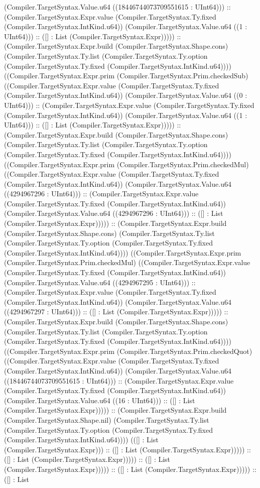 \documentclass[11pt]{article}
\begin{document}
(Compiler.TargetSyntax.Value.u64 ((18446744073709551615 : UInt64))) :: (Compiler.TargetSyntax.Expr.value (Compiler.TargetSyntax.Ty.fixed (Compiler.TargetSyntax.IntKind.u64)) (Compiler.TargetSyntax.Value.u64 ((1 : UInt64))) :: ([] : List (Compiler.TargetSyntax.Expr))))) :: (Compiler.TargetSyntax.Expr.build (Compiler.TargetSyntax.Shape.cons) (Compiler.TargetSyntax.Ty.list (Compiler.TargetSyntax.Ty.option (Compiler.TargetSyntax.Ty.fixed (Compiler.TargetSyntax.IntKind.u64)))) ((Compiler.TargetSyntax.Expr.prim (Compiler.TargetSyntax.Prim.checkedSub) ((Compiler.TargetSyntax.Expr.value (Compiler.TargetSyntax.Ty.fixed (Compiler.TargetSyntax.IntKind.u64)) (Compiler.TargetSyntax.Value.u64 ((0 : UInt64))) :: (Compiler.TargetSyntax.Expr.value (Compiler.TargetSyntax.Ty.fixed (Compiler.TargetSyntax.IntKind.u64)) (Compiler.TargetSyntax.Value.u64 ((1 : UInt64))) :: ([] : List (Compiler.TargetSyntax.Expr))))) :: (Compiler.TargetSyntax.Expr.build (Compiler.TargetSyntax.Shape.cons) (Compiler.TargetSyntax.Ty.list (Compiler.TargetSyntax.Ty.option (Compiler.TargetSyntax.Ty.fixed (Compiler.TargetSyntax.IntKind.u64)))) ((Compiler.TargetSyntax.Expr.prim (Compiler.TargetSyntax.Prim.checkedMul) ((Compiler.TargetSyntax.Expr.value (Compiler.TargetSyntax.Ty.fixed (Compiler.TargetSyntax.IntKind.u64)) (Compiler.TargetSyntax.Value.u64 ((4294967296 : UInt64))) :: (Compiler.TargetSyntax.Expr.value (Compiler.TargetSyntax.Ty.fixed (Compiler.TargetSyntax.IntKind.u64)) (Compiler.TargetSyntax.Value.u64 ((4294967296 : UInt64))) :: ([] : List (Compiler.TargetSyntax.Expr))))) :: (Compiler.TargetSyntax.Expr.build (Compiler.TargetSyntax.Shape.cons) (Compiler.TargetSyntax.Ty.list (Compiler.TargetSyntax.Ty.option (Compiler.TargetSyntax.Ty.fixed (Compiler.TargetSyntax.IntKind.u64)))) ((Compiler.TargetSyntax.Expr.prim (Compiler.TargetSyntax.Prim.checkedMul) ((Compiler.TargetSyntax.Expr.value (Compiler.TargetSyntax.Ty.fixed (Compiler.TargetSyntax.IntKind.u64)) (Compiler.TargetSyntax.Value.u64 ((4294967295 : UInt64))) :: (Compiler.TargetSyntax.Expr.value (Compiler.TargetSyntax.Ty.fixed (Compiler.TargetSyntax.IntKind.u64)) (Compiler.TargetSyntax.Value.u64 ((4294967297 : UInt64))) :: ([] : List (Compiler.TargetSyntax.Expr))))) :: (Compiler.TargetSyntax.Expr.build (Compiler.TargetSyntax.Shape.cons) (Compiler.TargetSyntax.Ty.list (Compiler.TargetSyntax.Ty.option (Compiler.TargetSyntax.Ty.fixed (Compiler.TargetSyntax.IntKind.u64)))) ((Compiler.TargetSyntax.Expr.prim (Compiler.TargetSyntax.Prim.checkedQuot) ((Compiler.TargetSyntax.Expr.value (Compiler.TargetSyntax.Ty.fixed (Compiler.TargetSyntax.IntKind.u64)) (Compiler.TargetSyntax.Value.u64 ((18446744073709551615 : UInt64))) :: (Compiler.TargetSyntax.Expr.value (Compiler.TargetSyntax.Ty.fixed (Compiler.TargetSyntax.IntKind.u64)) (Compiler.TargetSyntax.Value.u64 ((16 : UInt64))) :: ([] : List (Compiler.TargetSyntax.Expr))))) :: (Compiler.TargetSyntax.Expr.build (Compiler.TargetSyntax.Shape.nil) (Compiler.TargetSyntax.Ty.list (Compiler.TargetSyntax.Ty.option (Compiler.TargetSyntax.Ty.fixed (Compiler.TargetSyntax.IntKind.u64)))) (([] : List (Compiler.TargetSyntax.Expr))) :: ([] : List (Compiler.TargetSyntax.Expr))))) :: ([] : List (Compiler.TargetSyntax.Expr))))) :: ([] : List (Compiler.TargetSyntax.Expr))))) :: ([] : List (Compiler.TargetSyntax.Expr))))) :: ([] : List 
\end{document}
